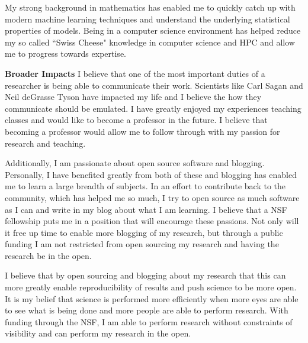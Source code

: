 \documentclass[12pt]{article}
\begin{document}
My strong background in mathematics has enabled me to quickly catch up with
modern machine learning techniques and understand the underlying statistical
properties of models. Being in a computer science environment has helped reduce
my so called ``Swiss Cheese" knowledge in computer science and HPC and allow me 
to progress towards expertise. 

\textbf{Broader Impacts}
%
I believe that one of the most important duties of a researcher is being able to
communicate their work. Scientists like Carl Sagan and Neil deGrasse Tyson have
impacted my life and I believe the how they communicate should be emulated. I
have greatly enjoyed my experiences teaching classes and would like to become a
professor in the future. I believe that becoming a professor would allow me to
follow through with my passion for research and teaching. 

Additionally, I am passionate about open source software and blogging.
Personally, I have benefited greatly from both of these and blogging has enabled
me to learn a large breadth of subjects. In an effort to contribute back to the
community, which has helped me so much, I try to open source as much software as
I can and write in my blog about what I am learning. I believe that a NSF
fellowship puts me in a position that will encourage these passions. Not only
will it free up time to enable more blogging of my research, but through a
public funding I am not restricted from open sourcing my research and having the
research be in the open.

I believe that by open sourcing and blogging about my research that this can
more greatly enable reproducibility of results and push science to be more open.
It is my belief that science is performed more efficiently when more eyes are
able to see what is being done and more people are able to perform research.
With funding through the NSF, I am able to perform research without constraints
of visibility and can perform my research in the open.

%
\end{document}
